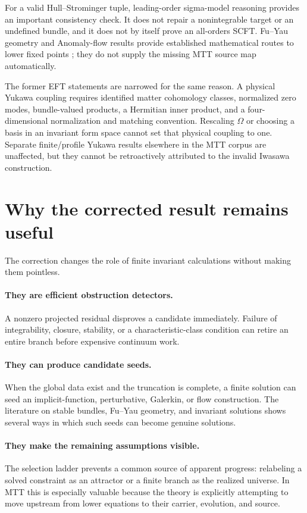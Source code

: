 \documentclass[11pt]{article}
\numberwithin{equation}{section}
\theoremstyle{definition}
\theoremstyle{plain}
\theoremstyle{remark}
\begin{document}
For a valid Hull--Strominger tuple, leading-order sigma-model reasoning
provides an important consistency check.  It does not repair a nonintegrable
target or an undefined bundle, and it does not by itself prove an all-orders
SCFT.  Fu--Yau geometry and Anomaly-flow results provide established
mathematical routes to lower fixed points
\cite{FuYau2008,PhongPicardZhang2018}; they do not supply the missing MTT
source map automatically.

The former EFT statements are narrowed for the same reason.  A physical
Yukawa coupling requires identified matter cohomology classes, normalized
zero modes, bundle-valued products, a Hermitian inner product, and a
four-dimensional normalization and matching convention.  Rescaling
\(\Omega\) or choosing a basis in an invariant form space cannot set that
physical coupling to one.  Separate finite/profile Yukawa results elsewhere
in the MTT corpus are unaffected, but they cannot be retroactively attributed
to the invalid Iwasawa construction.

\section{Why the corrected result remains useful}

The correction changes the role of finite invariant calculations without
making them pointless.

\paragraph{They are efficient obstruction detectors.}
A nonzero projected residual disproves a candidate immediately.  Failure of
integrability, closure, stability, or a characteristic-class condition can
retire an entire branch before expensive continuum work.

\paragraph{They can produce candidate seeds.}
When the global data exist and the truncation is complete, a finite solution
can seed an implicit-function, perturbative, Galerkin, or flow construction.
The literature on stable bundles, Fu--Yau geometry, and invariant solutions
shows several ways in which such seeds can become genuine solutions.

\paragraph{They make the remaining assumptions visible.}
The selection ladder prevents a common source of apparent progress:
relabeling a solved constraint as an attractor or a finite branch as the
realized universe.  In MTT this is especially valuable because the theory is
explicitly attempting to move upstream from lower equations to their
carrier, evolution, and source.
\end{document}
